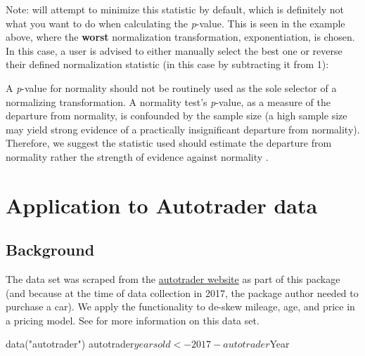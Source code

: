 Note:  will attempt to minimize this statistic by
default, which is definitely not what you want to do when calculating
the \textit{p}-value. This is seen in the example above, where the
\textbf{worst} normalization transformation, exponentiation, is chosen.
In this case, a user is advised to either manually select the best one
or reverse their defined normalization statistic (in this case by
subtracting it from 1):

\begin{Schunk}
\end{Schunk}

A \textit{p}-value for normality should not be routinely used as the
sole selector of a normalizing transformation. A normality test's
\textit{p}-value, as a measure of the departure from normality, is
confounded by the sample size (a high sample size may yield strong
evidence of a practically insignificant departure from normality).
Therefore, we suggest the statistic used should estimate the departure
from normality rather the strength of evidence against normality
\citep[e.g.,][]{normality}.

\hypertarget{application-to-autotrader-data}{%
\section{Application to Autotrader
data}\label{application-to-autotrader-data}}

\hypertarget{background}{%
\subsection{Background}\label{background}}

The  data set was scraped from the
\href{https://www.autotrader.com/}{autotrader website} as part of this
package (and because at the time of data collection in 2017, the package
author needed to purchase a car). We apply the 
functionality to de-skew mileage, age, and price in a pricing model. See
 for more information on this data set.

\begin{Schunk}
\begin{Sinput}
data("autotrader")
autotrader$yearsold <- 2017 - autotrader$Year
\end{Sinput}
\end{Schunk}

